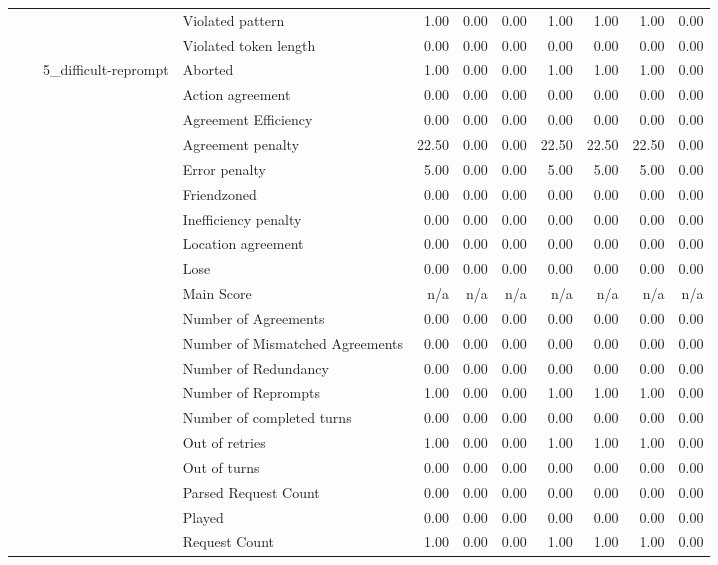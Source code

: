 \begin{tabular}{llllrrrrrrr}
 &  &  & Violated pattern & 1.00 & 0.00 & 0.00 & 1.00 & 1.00 & 1.00 & 0.00 \\
 &  &  & Violated token length & 0.00 & 0.00 & 0.00 & 0.00 & 0.00 & 0.00 & 0.00 \\
\cline{3-11}
 &  & \multirow[t]{27}{*}{5_difficult-reprompt} & Aborted & 1.00 & 0.00 & 0.00 & 1.00 & 1.00 & 1.00 & 0.00 \\
 &  &  & Action agreement & 0.00 & 0.00 & 0.00 & 0.00 & 0.00 & 0.00 & 0.00 \\
 &  &  & Agreement Efficiency & 0.00 & 0.00 & 0.00 & 0.00 & 0.00 & 0.00 & 0.00 \\
 &  &  & Agreement penalty & 22.50 & 0.00 & 0.00 & 22.50 & 22.50 & 22.50 & 0.00 \\
 &  &  & Error penalty & 5.00 & 0.00 & 0.00 & 5.00 & 5.00 & 5.00 & 0.00 \\
 &  &  & Friendzoned & 0.00 & 0.00 & 0.00 & 0.00 & 0.00 & 0.00 & 0.00 \\
 &  &  & Inefficiency penalty & 0.00 & 0.00 & 0.00 & 0.00 & 0.00 & 0.00 & 0.00 \\
 &  &  & Location agreement & 0.00 & 0.00 & 0.00 & 0.00 & 0.00 & 0.00 & 0.00 \\
 &  &  & Lose & 0.00 & 0.00 & 0.00 & 0.00 & 0.00 & 0.00 & 0.00 \\
 &  &  & Main Score & n/a & n/a & n/a & n/a & n/a & n/a & n/a \\
 &  &  & Number of Agreements & 0.00 & 0.00 & 0.00 & 0.00 & 0.00 & 0.00 & 0.00 \\
 &  &  & Number of Mismatched Agreements & 0.00 & 0.00 & 0.00 & 0.00 & 0.00 & 0.00 & 0.00 \\
 &  &  & Number of Redundancy & 0.00 & 0.00 & 0.00 & 0.00 & 0.00 & 0.00 & 0.00 \\
 &  &  & Number of Reprompts & 1.00 & 0.00 & 0.00 & 1.00 & 1.00 & 1.00 & 0.00 \\
 &  &  & Number of completed turns & 0.00 & 0.00 & 0.00 & 0.00 & 0.00 & 0.00 & 0.00 \\
 &  &  & Out of retries & 1.00 & 0.00 & 0.00 & 1.00 & 1.00 & 1.00 & 0.00 \\
 &  &  & Out of turns & 0.00 & 0.00 & 0.00 & 0.00 & 0.00 & 0.00 & 0.00 \\
 &  &  & Parsed Request Count & 0.00 & 0.00 & 0.00 & 0.00 & 0.00 & 0.00 & 0.00 \\
 &  &  & Played & 0.00 & 0.00 & 0.00 & 0.00 & 0.00 & 0.00 & 0.00 \\
 &  &  & Request Count & 1.00 & 0.00 & 0.00 & 1.00 & 1.00 & 1.00 & 0.00 \\

\end{tabular}
